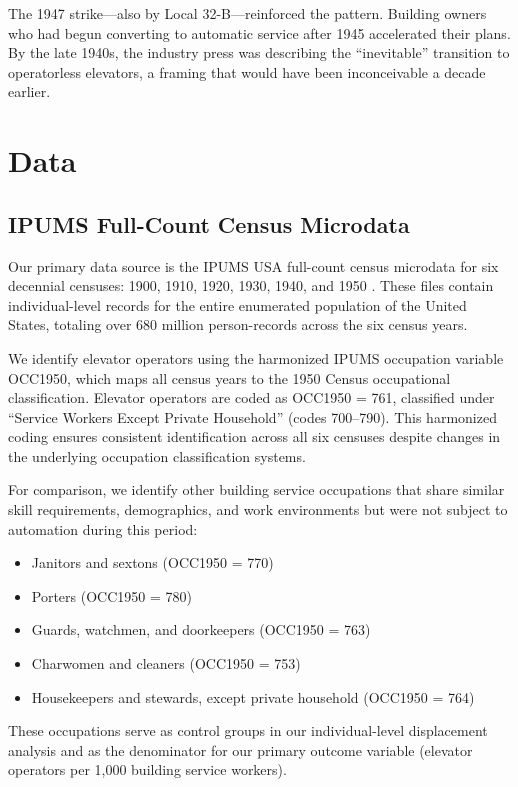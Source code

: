 \documentclass[12pt]{article}
\begin{document}
The 1947 strike---also by Local 32-B---reinforced the pattern. Building owners who had begun converting to automatic service after 1945 accelerated their plans. By the late 1940s, the industry press was describing the ``inevitable'' transition to operatorless elevators, a framing that would have been inconceivable a decade earlier.


\section{Data}

\subsection{IPUMS Full-Count Census Microdata}

Our primary data source is the IPUMS USA full-count census microdata for six decennial censuses: 1900, 1910, 1920, 1930, 1940, and 1950 \citep{ruggles2024}. These files contain individual-level records for the entire enumerated population of the United States, totaling over 680 million person-records across the six census years.

We identify elevator operators using the harmonized IPUMS occupation variable OCC1950, which maps all census years to the 1950 Census occupational classification. Elevator operators are coded as OCC1950 = 761, classified under ``Service Workers Except Private Household'' (codes 700--790). This harmonized coding ensures consistent identification across all six censuses despite changes in the underlying occupation classification systems.

For comparison, we identify other building service occupations that share similar skill requirements, demographics, and work environments but were not subject to automation during this period:
\begin{itemize}
    \item Janitors and sextons (OCC1950 = 770)
    \item Porters (OCC1950 = 780)
    \item Guards, watchmen, and doorkeepers (OCC1950 = 763)
    \item Charwomen and cleaners (OCC1950 = 753)
    \item Housekeepers and stewards, except private household (OCC1950 = 764)
\end{itemize}

These occupations serve as control groups in our individual-level displacement analysis and as the denominator for our primary outcome variable (elevator operators per 1,000 building service workers).
\end{document}
